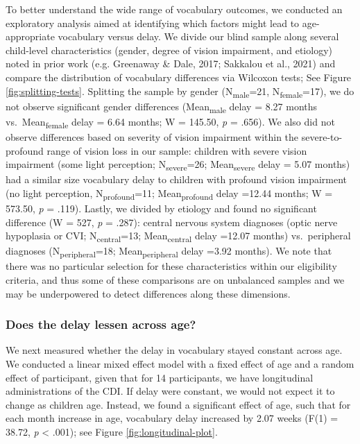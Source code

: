 \documentclass[
  man,floatsintext]{apa6}
\begin{document}
To better understand the wide range of vocabulary outcomes, we conducted an exploratory analysis aimed at identifying which factors might lead to age-appropriate vocabulary versus delay. We divide our blind sample along several child-level characteristics (gender, degree of vision impairment, and etiology) noted in prior work (e.g. Greenaway \& Dale, 2017; Sakkalou et al., 2021) and compare the distribution of vocabulary differences via Wilcoxon tests; See Figure \ref{fig:splitting-tests}. Splitting the sample by gender (N\textsubscript{male}=21, N\textsubscript{female}=17), we do not observe significant gender differences (Mean\textsubscript{male} delay = 8.27 months vs.~Mean\textsubscript{female} delay = 6.64 months; W = 145.50, \emph{p} = .656). We also did not observe differences based on severity of vision impairment within the severe-to-profound range of vision loss in our sample: children with severe vision impairment (some light perception; N\textsubscript{severe}=26; Mean\textsubscript{severe} delay = 5.07 months) had a similar size vocabulary delay to children with profound vision impairment (no light perception, N\textsubscript{profound}=11; Mean\textsubscript{profound} delay =12.44 months; W = 573.50, \emph{p} = .119). Lastly, we divided by etiology and found no significant difference (W = 527, \emph{p} = .287): central nervous system diagnoses (optic nerve hypoplasia or CVI; N\textsubscript{central}=13; Mean\textsubscript{central} delay =12.07 months) vs.~peripheral diagnoses (N\textsubscript{peripheral}=18; Mean\textsubscript{peripheral} delay =3.92 months). We note that there was no particular selection for these characteristics within our eligibility criteria, and thus some of these comparisons are on unbalanced samples and we may be underpowered to detect differences along these dimensions.

\hypertarget{does-the-delay-lessen-across-age}{%
\subsubsection{Does the delay lessen across age?}\label{does-the-delay-lessen-across-age}}

We next measured whether the delay in vocabulary stayed constant across age. We conducted a linear mixed effect model with a fixed effect of age and a random effect of participant, given that for 14 participants, we have longitudinal administrations of the CDI. If delay were constant, we would not expect it to change as children age. Instead, we found a significant effect of age, such that for each month increase in age, vocabulary delay increased by 2.07 weeks (F(1) = 38.72, \emph{p} \textless{} .001); see Figure \ref{fig:longitudinal-plot}.
\end{document}
